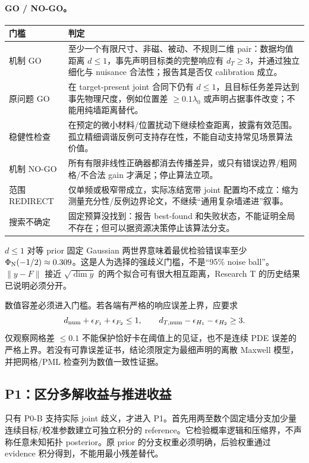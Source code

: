 \paragraph{GO / NO-GO。}
\begin{longtable}{p{24mm}p{124mm}}
\toprule
门槛 & 判定\\
\midrule
机制 GO & 至少一个有限尺寸、非磁、被动、不规则二维 pair：数据均值距离 $d\le1$，事先声明目标类的完整响应有 $d_T\ge3$，并通过独立细化与 nuisance 合法性；报告其是否仅 calibration 成立。\\
原问题 GO & 在 target-present joint 合同下仍有 $d\le1$，且目标任务差异达到事先物理尺度，例如位置差 $\ge0.1\lambda_0$ 或声明占据事件改变；不能用纯墙距离替代。\\
稳健性检查 & 在预定的微小材料/位置扰动下继续检查距离，披露有效范围。孤立精细调谐反例可支持存在性，不能自动支持常见场景算法价值。\\
机制 NO-GO & 所有有限非线性正确器都消去传播差异，或只有错误边界/粗网格/不合法 gain 才满足；停止算法立项。\\
范围 REDIRECT & 仅单频或极窄带成立，实际冻结宽带 joint 配置均不成立：缩为测量充分性/反例边界论文，不继续“通用复杂墙递进”叙事。\\
搜索不确定 & 固定预算没找到：报告 best-found 和失败状态，不能证明全局不存在；但可以据资源决策停止该算法分支。\\
\bottomrule
\end{longtable}

$d\le1$ 对等 prior 固定 Gaussian 两世界意味着最优检验错误率至少 $\Phi_{\rm N}(-1/2)\approx0.309$。这是人为选择的强歧义门槛，不是“95\% noise ball”。$\|y-F\|$ 接近 $\sqrt{\dim y}$ 的两个拟合可有很大相互距离，Research T 的历史结果已说明必须分开。\cite{R_T}

数值容差必须进入门槛。若各端有严格的响应误差上界，应要求
\[
d_{\rm num}+\epsilon_{F_1}+\epsilon_{F_2}\le1,\qquad
d_{T,\rm num}-\epsilon_{H_1}-\epsilon_{H_2}\ge3.
\]
仅观察网格差 $\le0.1$ 不能保护恰好卡在阈值上的见证，也不是连续 PDE 误差的严格上界。若没有可靠误差证书，结论须限定为最细声明的离散 Maxwell 模型，并把网格/PML 检查列为数值一致性证据。

\subsection{P1：区分多解收益与推进收益}
只有 P0-B 支持实际 joint 歧义，才进入 P1。首先用两至数个固定墙分支加少量连续目标/校准参数建立可独立积分的 reference。它检验概率逻辑和压缩界，不声称任意未知拓扑 posterior。原 prior 的分支权重必须明确，后验权重通过 evidence 积分得到，不能用最小残差替代。

